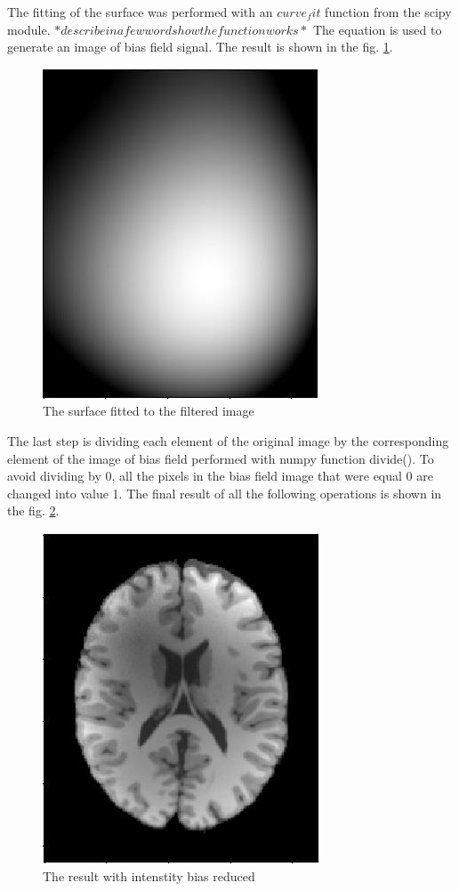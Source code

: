 The fitting of the surface was performed with an $curve_fit$ function from the scipy module. $*describe in a few words how the function works*$ The equation is used to generate an image of bias field signal. The result is shown in the fig. \ref{fig: Module2_3}.
\begin{figure}[H]
\centering{}\includegraphics[scale=0.7]{figures/Module_02/m2_1}\caption{The surface fitted to the filtered image}
\label{fig: Module2_3}
\end{figure}
The last step is dividing each element of the original image by the corresponding element of the image of bias field performed with numpy function divide(). To avoid dividing by 0, all the pixels in the bias field image that were equal 0 are changed into value 1. The final result of all the following operations is shown in the fig. \ref{fig: Module2_4}.
\begin{figure}[H]
\centering{}\includegraphics[scale=0.7]{figures/Module_02/m2_4}\caption{The result with intenstity bias reduced}
\label{fig: Module2_4}
\end{figure}